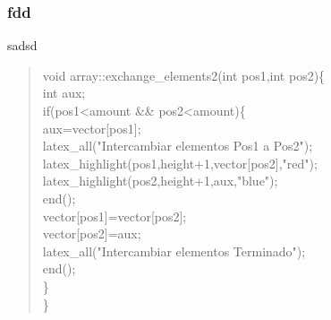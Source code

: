 \documentclass{beamer}
\begin{document}
\begin{frame}
\frametitle{fdd}
sadsd
\begin{quote}

void array::exchange_elements2(int pos1,int pos2)\{\\
		int aux;\\
		if(pos1<amount && pos2<amount)\{\\
			aux=vector[pos1];\\
			latex_all("Intercambiar elementos Pos1 a Pos2");\\
			latex_highlight(pos1,height+1,vector[pos2],"red");\\
			latex_highlight(pos2,height+1,aux,"blue");\\
			end();\\
			vector[pos1]=vector[pos2];\\
			vector[pos2]=aux;\\
			latex_all("Intercambiar elementos Terminado");\\
			end();\\
		\}	\\
	\}\\
	
\end{quote}




\end{frame}
\end{document}
